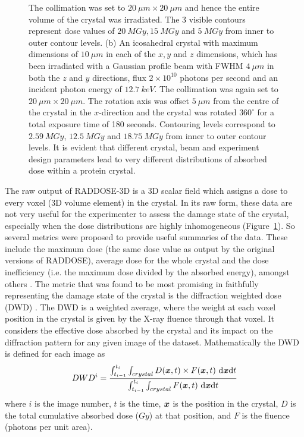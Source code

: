 \begin{figure}
{            The collimation was set to $20\ \mu m \times 20\ \mu m$ and hence the entire volume of the crystal was irradiated. The 3 visible contours represent dose values of $20\ MGy, 15\ MGy$ and $5\ MGy$ from inner to outer contour levels.
            (b) An icosahedral crystal with maximum dimensions of $10\ \mu m$ in each of the $x, y$ and $z$ dimensions, which has been irradiated with a Gaussian profile beam with FWHM $4\ \mu m$ in both the $z$ and $y$ directions, flux $2 \times 10^{10}$ photons per second and an incident photon energy of $12.7\ keV$. The collimation was again set to $20\ \mu m \times 20\ \mu m$. The rotation axis was offset $5\ \mu m$ from the centre of the crystal in the $x$-direction and the crystal was rotated $360^{\circ}$ for a total exposure time of 180 seconds. Contouring levels correspond to $2.59\ MGy$, $12.5\ MGy$ and $18.75\ MGy$ from inner to outer contour levels. It is evident that different crystal, beam and experiment design parameters lead to very different distributions of absorbed dose within a protein crystal.}
            \label{fig:RADDOSE-3D Polyhedral Crystal Examples}
        \end{figure}

        The raw output of RADDOSE-3D is a 3D scalar field which assigns a dose to every voxel (3D volume element) in the crystal.
        In its raw form, these data are not very useful for the experimenter to assess the damage state of the crystal, especially when the dose distributions are highly inhomogeneous (Figure~\ref{fig:RADDOSE-3D Polyhedral Crystal Examples}).
        So several metrics were proposed to provide useful summaries of the data.
        These include the maximum dose (the same dose value as output by the original versions of RADDOSE), average dose for the whole crystal and the dose inefficiency (i.e. the maximum dose divided by the absorbed energy), amongst others \cite{zeldin2012}.
        The metric that was found to be most promising in faithfully representing the damage state of the crystal is the diffraction weighted dose (DWD) \cite{zeldin2013dwd}. The DWD is a weighted average, where the weight at each voxel position in the crystal is given by the X-ray fluence through that voxel.
        It considers the effective dose absorbed by the crystal and its impact on the diffraction pattern for any given image of the dataset. Mathematically the DWD is defined for each image as
        \begin{equation}
            DWD^i = \f{\int_{t_{i-1}}^{t_i} \int_{crystal} D(\bs{x},t) \times F(\bs{x},t)\ \mathrm{d}\bs{x}\mathrm{d}t}{\int_{t_{i-1}}^{t_i} \int_{crystal} F(\bs{x},t)\ \mathrm{d}\bs{x}\mathrm{d}t}
        \end{equation}
        where $i$ is the image number, $t$ is the time, $\boldsymbol{x}$ is the position in the crystal, $D$ is the total cumulative absorbed dose ($Gy$) at that position, and $F$ is the fluence (photons per unit area).

